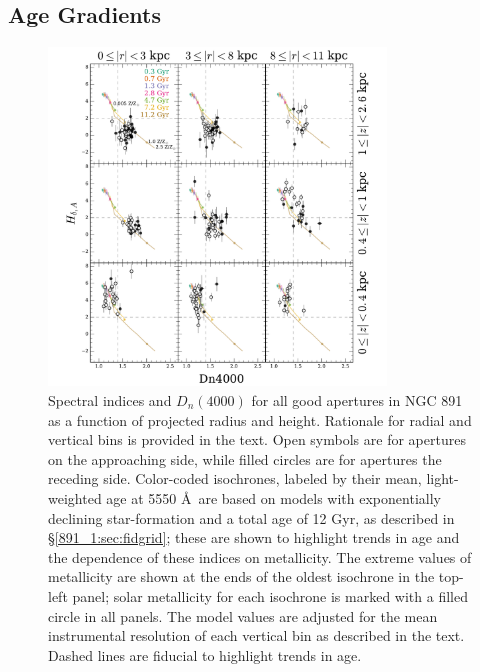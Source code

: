 \subsection{Age Gradients}
\label{891_1:sec:age_grad}
\begin{figure}
  \centering
  \includegraphics[width=0.8\textwidth]{891_1/figs/Dn4000_multires.pdf}
  \caption[$D_n(4000)$ vs \Hda in radius and height
  bins]{\label{fig:D4000_cuts}\fixspacing Spectral indices \Hda and
    $D_n(4000)$ for all good apertures in NGC 891 as a function of
    projected radius and height. Rationale for radial and vertical
    bins is provided in the text. Open symbols are for apertures on
    the approaching side, while filled circles are for apertures the
    receding side. Color-coded isochrones, labeled by their mean,
    light-weighted age at 5550 \AA\ are based on models with
    exponentially declining star-formation and a total age of 12 Gyr,
    as described in \S\ref{891_1:sec:fidgrid}; these are shown to
    highlight trends in age and the dependence of these indices on
    metallicity. The extreme values of metallicity are shown at the
    ends of the oldest isochrone in the top-left panel; solar
    metallicity for each isochrone is marked with a filled circle in
    all panels. The model values are adjusted for the mean
    instrumental resolution of each vertical bin as described in the
    text. Dashed lines are fiducial to highlight trends in age.}
\end{figure}

